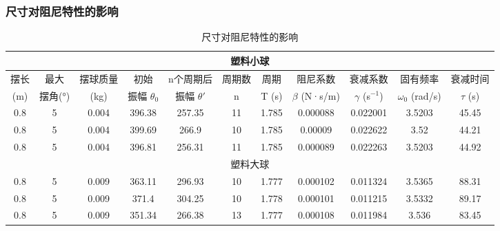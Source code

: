 \documentclass[lang=cn,a4paper,newtx,bibstyle=gb7714-2015]{elegantpaper}
\newcommand{\threelinetablestyle}{%
  \renewcommand{\arraystretch}{1.2}%
  \setlength{\tabcolsep}{3.5pt}%
  \small%
}
\numberwithin{equation}{section} %
\begin{document}
\subsubsection{尺寸对阻尼特性的影响}
\begin{table}[H]
\centering
\threelinetablestyle
\caption{尺寸对阻尼特性的影响}
\setlength{\tabcolsep}{2pt}
\footnotesize
\begin{tabular}{ccccccccccc}
\toprule
\multicolumn{11}{c}{塑料小球} \\
\midrule
摆长 & 最大 & 摆球质量 & 初始 & n个周期后 & 周期数 & 周期 & 阻尼系数 & 衰减系数 & 固有频率 & 衰减时间 \\
(m) & 摆角(°) & (kg) & 振幅 $\theta_0$ & 振幅 $\theta'$ & n & T (s) & $\beta$ (N·s/m) & $\gamma$ (s$^{-1}$) & $\omega_0$ (rad/s) & $\tau$ (s) \\
\midrule
0.8 & 5 & 0.004 & 396.38 & 257.35 & 11 & 1.785 & 0.000088 & 0.022001 & 3.5203 & 45.45 \\
0.8 & 5 & 0.004 & 399.69 & 266.9 & 10 & 1.785 & 0.00009 & 0.022622 & 3.52 & 44.21 \\
0.8 & 5 & 0.004 & 396.81 & 256.31 & 11 & 1.785 & 0.000089 & 0.022263 & 3.5203 & 44.92 \\
\midrule
\multicolumn{11}{c}{塑料大球} \\
\midrule
0.8 & 5 & 0.009 & 363.11 & 296.93 & 10 & 1.777 & 0.000102 & 0.011324 & 3.5365 & 88.31 \\
0.8 & 5 & 0.009 & 371.4 & 304.25 & 10 & 1.778 & 0.000101 & 0.011215 & 3.5332 & 89.17 \\
0.8 & 5 & 0.009 & 351.34 & 266.38 & 13 & 1.777 & 0.000108 & 0.011984 & 3.536 & 83.45 \\
\bottomrule
\end{tabular}
\label{tab:size_effect_on_damping}
\end{table}
\label{app:size_effect_on_damping}
\end{document}
